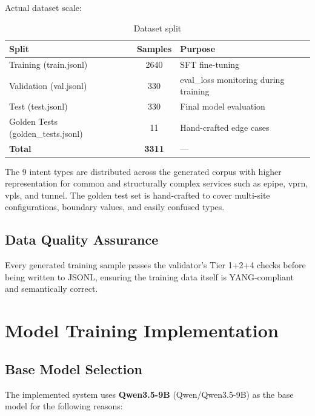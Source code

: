 \documentclass[12pt, a4paper]{article}
\newcommand{\yang}{\textsc{YANG}}
\begin{document}
\noindent
Actual dataset scale:

\begin{table}[H]
\centering
\caption{Dataset split}
\label{tab:data-split}
\small
\begin{tabular}{lcl}
\toprule
\textbf{Split} & \textbf{Samples} & \textbf{Purpose} \\
\midrule
Training (train.jsonl) & 2640 & SFT fine-tuning \\
Validation (val.jsonl)   & 330  & eval\_loss monitoring during training \\
Test (test.jsonl)  & 330  & Final model evaluation \\
Golden Tests (golden\_tests.jsonl) & 11 & Hand-crafted edge cases \\
\midrule
\textbf{Total} & \textbf{3311} & --- \\
\bottomrule
\end{tabular}
\end{table}

\noindent
The 9 intent types are distributed across the generated corpus with higher representation for common and structurally complex services such as epipe, vprn, vpls, and tunnel. The golden test set is hand-crafted to cover multi-site configurations, boundary values, and easily confused types.

\subsection{Data Quality Assurance}

Every generated training sample passes the validator's Tier 1+2+4 checks before being written to JSONL, ensuring the training data itself is \yang{}-compliant and semantically correct.

\section{Model Training Implementation}
\label{sec:training}

\subsection{Base Model Selection}

The implemented system uses \textbf{Qwen3.5-9B} (Qwen/Qwen3.5-9B) as the base model for the following reasons:
\end{document}
